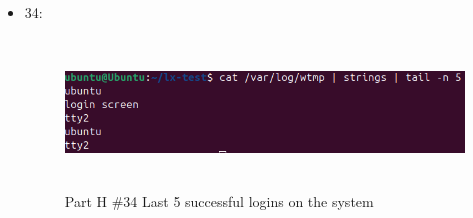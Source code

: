 \begin{itemize}
    \item 34: 
     \begin{figure}[H]
        \centering
        \includegraphics[width=15cm, height=4cm]{png/LinuxProblemSetPicsPNG/PartH34.png}
        \caption{Part H \#34 Last 5 successful logins on the system}
        \label{fig:partH 34}
    \end{figure}

\end{itemize}

